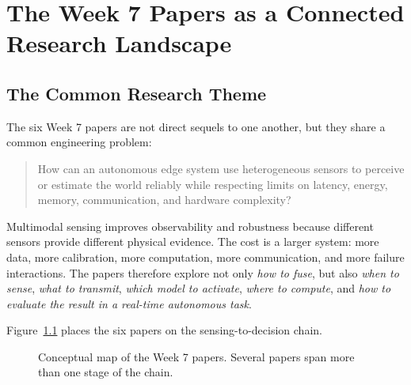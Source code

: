 \chapter{The Week 7 Papers as a Connected Research Landscape}
\label{chap:week7}

\section{The Common Research Theme}

The six Week 7 papers are not direct sequels to one another, but they share a common engineering problem:

\begin{quote}
How can an autonomous edge system use heterogeneous sensors to perceive or estimate the world reliably while respecting limits on latency, energy, memory, communication, and hardware complexity?
\end{quote}

Multimodal sensing improves observability and robustness because different sensors provide different physical evidence. The cost is a larger system: more data, more calibration, more computation, more communication, and more failure interactions. The papers therefore explore not only \emph{how to fuse}, but also \emph{when to sense}, \emph{what to transmit}, \emph{which model to activate}, \emph{where to compute}, and \emph{how to evaluate the result in a real-time autonomous task}.

Figure~\ref{fig:week7-map} places the six papers on the sensing-to-decision chain.

\begin{figure}[H]
    \centering
    \resizebox{\textwidth}{!}{}
    \caption{Conceptual map of the Week 7 papers. Several papers span more than one stage of the chain.}
    \label{fig:week7-map}
\end{figure}

